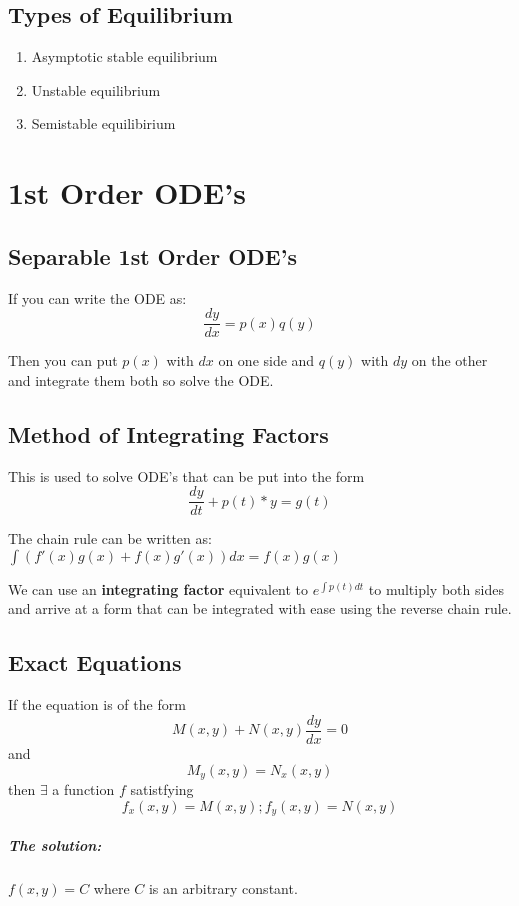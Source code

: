 \documentclass[a4paper,12pt]{report}
\begin{document}
\section{Types of Equilibrium}
\begin{enumerate}
\item Asymptotic stable equilibrium 
\item Unstable equilibrium 
\item Semistable equilibirium
\end{enumerate}

\chapter{1st Order ODE's}
\section{Separable 1st Order ODE's}
If you can write the ODE as: $$\frac{dy}{dx} = p(x)q(y)$$

Then you can put $p(x)$ with $dx$ on one side and $q(y)$ with  $dy$ on the other and 
integrate them both so solve the ODE.

\section{Method of Integrating Factors}
This is used to solve ODE's that can be put into the form 
$$\frac{dy}{dt} + p(t)*y = g(t)$$

The chain rule can be written as: $\int (f'(x)g(x) + f(x)g'(x)) dx =  f(x)g(x)$

We can use an \textbf{integrating factor} equivalent to $e^{\int p(t) dt}$ to multiply
both sides and arrive at a form that can be integrated with ease using the reverse chain 
rule.

\section{Exact Equations}
If the equation is of the form $$M(x, y) + N(x, y) \frac{dy}{dx} = 0$$
and $$M_y(x, y) = N_x(x, y)$$ 
then $\exists$ a function $f$ satistfying $$f_x(x, y) = M(x, y); f_y(x, y) = N(x, y)$$

\paragraph{The solution: } $f(x, y) = C$ where $C$ is an arbitrary constant.
\end{document}
